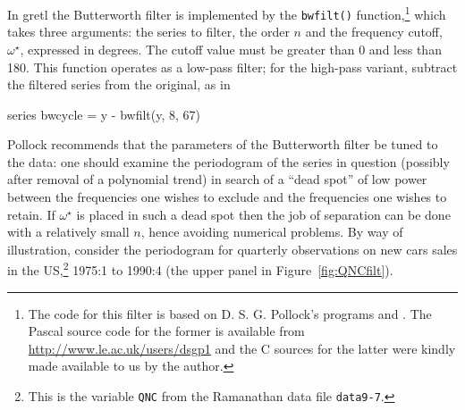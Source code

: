 In gretl the Butterworth filter is implemented by the
\verb+bwfilt()+ function,\footnote{The code for this filter is based
  on D. S. G. Pollock's programs  and . The
  Pascal source code for the former is available from
  \url{http://www.le.ac.uk/users/dsgp1} and the C sources for the
  latter were kindly made available to us by the author.} which takes
three arguments: the series to filter, the order $n$ and the frequency
cutoff, $\omega^{\star}$, expressed in degrees. The cutoff value must
be greater than 0 and less than 180. This function operates as a
low-pass filter; for the high-pass variant, subtract the filtered
series from the original, as in
%
\begin{code}
series bwcycle = y - bwfilt(y, 8, 67)
\end{code}

Pollock recommends that the parameters of the Butterworth filter be
tuned to the data: one should examine the periodogram of the series in
question (possibly after removal of a polynomial trend) in search of a
``dead spot'' of low power between the frequencies one wishes to
exclude and the frequencies one wishes to retain. If $\omega^{\star}$
is placed in such a dead spot then the job of separation can be done
with a relatively small $n$, hence avoiding numerical problems. By way
of illustration, consider the periodogram for quarterly observations
on new cars sales in the US,\footnote{This is the variable
  \texttt{QNC} from the Ramanathan data file \texttt{data9-7}.} 1975:1
to 1990:4 (the upper panel in Figure~\ref{fig:QNCfilt}).

